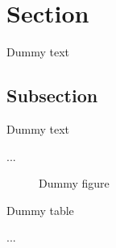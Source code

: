 \documentclass{article}
\begin{document}
\tableofcontents
\newpage

\section{Section}

Dummy text

\subsection{Subsection}

Dummy text

...
\begin{figure}
  \caption{Dummy figure}
\end{figure}

\begin{table}
  \caption{Dummy table}
\end{table}
...
\begin{appendix}
  \listoffigures
  \listoftables
\end{appendix}
\end{document}
